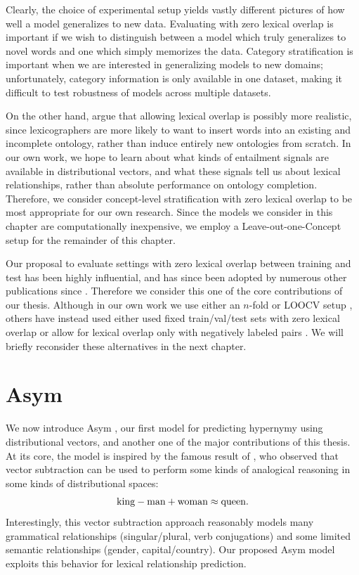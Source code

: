 Clearly, the choice of experimental setup yields vastly different pictures of
how well a model generalizes to new data. Evaluating with zero lexical overlap
is important if we wish to distinguish between a model which truly generalizes
to novel words and one which simply memorizes the data. Category stratification
is important when we are interested in generalizing models to new domains;
unfortunately, category information is only available in one dataset, making
it difficult to test robustness of models across multiple datasets.

On the other hand,  argue that allowing lexical
overlap is possibly more realistic, since lexicographers are more likely to
want to insert words into an existing and incomplete ontology, rather than
induce entirely new ontologies from scratch. In our own work, we hope to learn
about what kinds of entailment signals are available in distributional
vectors, and what these signals tell us about lexical relationships, rather
than absolute performance on ontology completion. Therefore, we consider
concept-level stratification with zero lexical overlap to be most appropriate
for our own research. Since the models we consider in this chapter are
computationally inexpensive, we employ a Leave-out-one-Concept setup for the
remainder of this chapter.

Our proposal to evaluate settings with zero lexical overlap between training
and test has been highly influential, and has since been adopted by numerous
other publications since
\cite{levy:2015:naacl,kruszewski:2015:tacl,roller:2016:emnlp,shwartz:2016:acl,vylomova:2016:acl}.
Therefore we consider this one of the core contributions of our thesis.
Although in our own work we use either an $n$-fold \cite{roller:2016:emnlp} or
LOOCV setup \cite{roller:2014:coling}, others have instead used either used
fixed train/val/test sets with zero lexical overlap
\cite{levy:2015:naacl,shwartz:2016:acl,vylomova:2016:acl} or allow for lexical
overlap only with negatively labeled pairs \cite{kruszewski:2015:tacl}. We
will briefly reconsider these alternatives in the next chapter.

\section{Asym}

We now introduce Asym \cite{roller:2014:coling}, our first model for
predicting hypernymy using distributional vectors, and another one of the major
contributions of this thesis. At its core, the model is
inspired by the famous result of , who observed that
vector subtraction can be used to perform some kinds of analogical reasoning in
some kinds of distributional spaces:
\begin{equation*}
  \mathbf{\text{king}} - \mathbf{\text{man}} + \mathbf{\text{woman}} \approx \mathbf{\text{queen}}.
\end{equation*}
Interestingly, this vector subtraction approach reasonably models many
grammatical relationships (singular/plural, verb conjugations) and some limited
semantic relationships (gender, capital/country). Our proposed Asym model
exploits this behavior for lexical relationship prediction.

